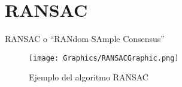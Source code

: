\section{RANSAC}

RANSAC o ``RANdom SAmple Consensus''

\begin{figure}[!h]
    \centering
    \texttt{[image: Graphics/RANSACGraphic.png]}
    \caption{Ejemplo del algoritmo RANSAC}
    \label{fig:RansacExample}
\end{figure}
